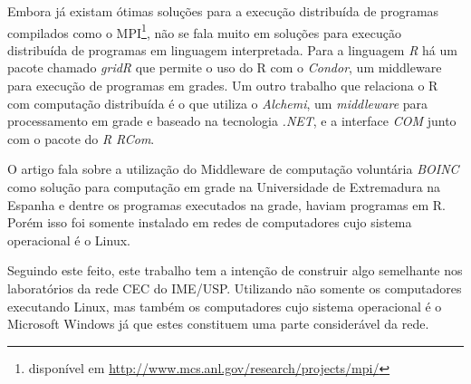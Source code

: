 Embora já existam ótimas soluções para a execução distribuída de programas compilados como o
 MPI\footnote{disponível em \url{http://www.mcs.anl.gov/research/projects/mpi/}}, não se fala muito em soluções 
para execução distribuída de programas em linguagem interpretada. 
Para a linguagem \emph{R} há um pacote chamado \emph{gridR} que permite o uso do R com o \emph{Condor}, %
um middleware para execução de programas em grades.  
Um outro trabalho que relaciona o R com computação distribuída é o \cite{Dias} que 
utiliza o \emph{Alchemi}, um \textit{middleware} para processamento em grade e baseado na 
tecnologia \textit{.NET}, e a interface \textit{COM} junto com o pacote do \emph{R}
\emph{RCom}.  


O artigo \cite{boinc} fala sobre a utilização do Middleware de computação voluntária \emph{BOINC} como solução para computação 
em grade na Universidade de Extremadura na Espanha e dentre os programas executados na grade, haviam
programas em R. Porém isso foi somente instalado em redes de computadores cujo sistema
operacional é o Linux. 

Seguindo este feito, este trabalho tem a intenção de construir algo semelhante nos laboratórios da rede CEC do IME/USP. Utilizando
não somente os computadores executando Linux, mas também os computadores cujo sistema operacional é o Microsoft Windows %
já que estes constituem uma parte considerável da rede.  



